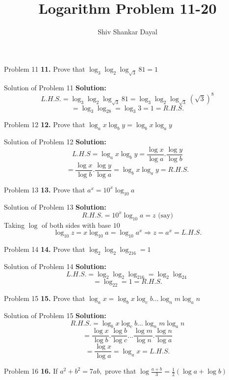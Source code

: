 \documentclass[aspectratio=1610,8pt]{beamer}
\title{Logarithm Problem 11-20}
\author[Shiv Shankar Dayal]{Shiv Shankar Dayal}
\begin{document}
\begin{frame}
  \titlepage
\end{frame}
\begin{frame}{Problem 11}
  \textbf{11.} Prove that $\log_3\log_2\log_{\sqrt{3}}81 = 1$
\end{frame}
\begin{frame}{Solution of Problem 11}
  \textbf{Solution:} $$L.H.S. = \log_3\log_2\log_{\sqrt{3}}81 = \log_3\log_2\log_{\sqrt{3}}(\sqrt{3})^8$$
  $$= \log_3\log_28 = \log_3 3 = 1 = R.H.S.$$
\end{frame}
\begin{frame}{Problem 12}
  \textbf{12.} Prove that $\log_ax\log_by = \log_bx\log_ay$
\end{frame}
\begin{frame}{Solution of Problem 12}
  \textbf{Solution:} $$L.H.S = \log_ax\log_by = \frac{\log x}{\log a}.\frac{\log y}{\log b}$$
  $$= \frac{\log x}{\log b}.\frac{\log y}{\log a} = \log_bx\log_ay = R.H.S.$$
\end{frame}
\begin{frame}{Problem 13}
  \textbf{13.} Prove that $a^x = 10^x\log_{10}a$
\end{frame}
\begin{frame}{Solution of Problem 13}
  \textbf{Solution:} $$R.H.S. = 10^x\log_{10}a = z\text{~(say)}$$
  Taking $\log$ of both sides with base $10$
  $$\log_{10}z = x\log_{10}a = \log_{10}a^x \Rightarrow z = a^x = L.H.S.$$
\end{frame}
\begin{frame}{Problem 14}
  \textbf{14.} Prove that $\log_2\log_2\log_216 = 1$
\end{frame}
\begin{frame}{Solution of Problem 14}
  \textbf{Solution:} $$L.H.S. = \log_2\log_2\log_216 = \log_2\log_24$$
  $$=\log_22 = 1 = R.H.S.$$
\end{frame}
\begin{frame}{Problem 15}
  \textbf{15.} Prove that $\log_ax = \log_bx\log_cb\ldots\log_nm\log_an$
\end{frame}
\begin{frame}{Solution of Problem 15}
  \textbf{Solution:} $$R.H.S. = \log_bx\log_cb\ldots\log_nm\log_an$$
  $$= \frac{\log x}{\log b}.\frac{\log b}{\log c}\ldots\frac{\log m}{\log n}.\frac{\log n}{\log a}$$
  $$= \frac{\log x}{\log a} = \log_ax = L.H.S.$$
\end{frame}
\begin{frame}{Problem 16}
  \textbf{16.} If $a^2 + b^2 = 7ab,$ prove that $\log\frac{a + b}{3} = \frac{1}{2}(\log a + \log b)$
\end{frame}
\end{document}
